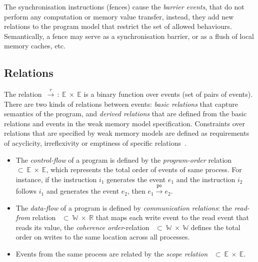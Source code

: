 The synchronisation instructions (fences) cause the \textit{barrier events}, that do not perform any computation or memory value transfer, instead, they add new relations to the program model that restrict the set of allowed behaviours. Semantically, a fence may serve as a synchronisation barrier, or as a flush of local memory caches, etc.


\subsection{Relations}
\label{ch:wmm:model:relations}


The relation~$\xrightarrow{r}\,:~\mathbb{E}~\times~\mathbb{E}$ is a binary function over events (set of pairs of events). There are two kinds of relations between events: \textit{basic relations} %
that capture semantics of the program, and \textit{derived relations} that are defined from the basic relations and events in the weak memory model specification. Constraints over relations that are specified by weak memory models are defined as requirements of acyclicity, irreflexivity or emptiness of specific relations~\cite{alglave2016syntax}.

\begin{itemize}
	\item
	The \textit{control-flow} of a program is defined by the \textit{program-order} relation \po~$\subset~\mathbb{E}~\times~\mathbb{E}$, which represents the total order of events of same process.
	For instance, if the instruction $i_1$ generates the event $e_1$ and the instruction $i_2$ follows $i_1$ and generates the event $e_2$, then $e_1 \xrightarrow{\mathtt{po}} e_2$. 

	\item
	The \textit{data-flow} of a program is defined by \textit{communication relations}: the \textit{read-from} relation \rf~$\subset~\mathbb{W}~\times~\mathbb{R}$ that maps each write event to the read event that reads its value, the \textit{coherence order}-relation \co~$\subset~\mathbb{W}~\times~\mathbb{W}$
	defines the total order on writes to the same location across all processes. 

	\item
	Events from the same process are related by the \textit{scope relation} \sr~$\subset~\mathbb{E}~\times~\mathbb{E}$. 
\end{itemize}

